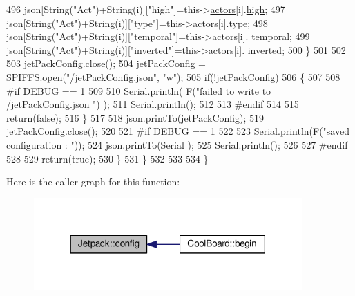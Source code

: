\begin{DoxyCode}
496                 json[String(\textcolor{stringliteral}{"Act"})+String(i)][\textcolor{stringliteral}{"high"}]=this->\hyperlink{classJetpack_a7e16d2f97837f9712a2e6de1c50d99db}{actors}[i].\hyperlink{structJetpack_1_1state_a54cc9291c7cc30102a07fd2b0ccd8dde}{high};
497                 json[String(\textcolor{stringliteral}{"Act"})+String(i)][\textcolor{stringliteral}{"type"}]=this->\hyperlink{classJetpack_a7e16d2f97837f9712a2e6de1c50d99db}{actors}[i].\hyperlink{structJetpack_1_1state_a9143580871c2e573fb502bb94c1da8e5}{type};
498                 json[String(\textcolor{stringliteral}{"Act"})+String(i)][\textcolor{stringliteral}{"temporal"}]=this->\hyperlink{classJetpack_a7e16d2f97837f9712a2e6de1c50d99db}{actors}[i].
      \hyperlink{structJetpack_1_1state_abd6039e7a48856550b0ffbf8bcff7bdd}{temporal};
499                 json[String(\textcolor{stringliteral}{"Act"})+String(i)][\textcolor{stringliteral}{"inverted"}]=this->\hyperlink{classJetpack_a7e16d2f97837f9712a2e6de1c50d99db}{actors}[i].
      \hyperlink{structJetpack_1_1state_a6bc03bb8f05b10aa142dbb0c39c87fb5}{inverted}; 
500             \}
501             
502 
503             jetPackConfig.close();          
504             jetPackConfig = SPIFFS.open(\textcolor{stringliteral}{"/jetPackConfig.json"}, \textcolor{stringliteral}{"w"});            
505             \textcolor{keywordflow}{if}(!jetPackConfig)
506             \{
507             
508 \textcolor{preprocessor}{            #if DEBUG == 1 }
509 
510                 Serial.println( F(\textcolor{stringliteral}{"failed to write to /jetPackConfig.json "}) );
511                 Serial.println();
512             
513 \textcolor{preprocessor}{            #endif}
514                 
515                 \textcolor{keywordflow}{return}(\textcolor{keyword}{false});          
516             \}  
517 
518             json.printTo(jetPackConfig);
519             jetPackConfig.close();
520 
521 \textcolor{preprocessor}{        #if DEBUG == 1 }
522             
523             Serial.println(F(\textcolor{stringliteral}{"saved configuration : "}));
524             json.printTo(Serial );
525             Serial.println();       
526         
527 \textcolor{preprocessor}{        #endif}
528 
529             \textcolor{keywordflow}{return}(\textcolor{keyword}{true}); 
530         \}
531     \}   
532     
533 
534 \}
\end{DoxyCode}
Here is the caller graph for this function\+:
\nopagebreak
\begin{figure}[H]
\begin{center}
\leavevmode
\includegraphics[width=291pt]{classJetpack_ab065ee83e244265a2223a22f3ee4a719_icgraph}
\end{center}
\end{figure}
\mbox{\label{classJetpack_a9e703197093094b963f9ad57817495b8}} 
